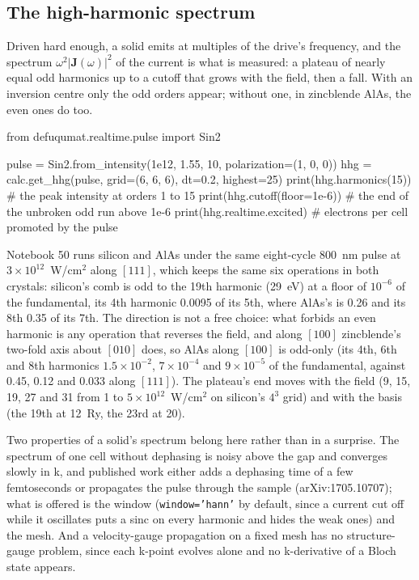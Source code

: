 \documentclass[11pt,a4paper]{article}
\newcommand{\code}[1]{\texttt{\small #1}}
\begin{document}
\subsection{The high-harmonic spectrum}

Driven hard enough, a solid emits at multiples of the drive's frequency, and the
spectrum $\omega^2|\mathbf J(\omega)|^2$ of the current is what is measured:
a plateau of nearly equal odd harmonics up to a cutoff that grows with the field,
then a fall. With an inversion centre only the odd orders appear; without one,
in zincblende AlAs, the even ones do too.

\begin{pycode}
from defuqumat.realtime.pulse import Sin2

pulse = Sin2.from_intensity(1e12, 1.55, 10, polarization=(1, 0, 0))
hhg = calc.get_hhg(pulse, grid=(6, 6, 6), dt=0.2, highest=25)
print(hhg.harmonics(15))          # the peak intensity at orders 1 to 15
print(hhg.cutoff(floor=1e-6))     # the end of the unbroken odd run above 1e-6
print(hhg.realtime.excited)       # electrons per cell promoted by the pulse
\end{pycode}

Notebook 50 runs silicon and AlAs under the same eight-cycle 800~nm pulse at
$3\times10^{12}$~W/cm$^2$ along $[111]$, which keeps the same six operations in both
crystals: silicon's comb is odd to the 19th harmonic (29~eV) at a floor of
$10^{-6}$ of the fundamental, its 4th harmonic 0.0095 of its 5th, where AlAs's is
0.26 and its 8th 0.35 of its 7th. The direction is not a free choice: what forbids
an even harmonic is any operation that reverses the field, and along $[100]$
zincblende's two-fold axis about $[010]$ does, so AlAs along $[100]$ is odd-only
(its 4th, 6th and 8th harmonics $1.5\times10^{-2}$, $7\times10^{-4}$ and
$9\times10^{-5}$ of the fundamental, against 0.45, 0.12 and 0.033 along $[111]$).
The plateau's end moves with the field (9, 15, 19, 27 and 31 from 1 to
$5\times10^{12}$~W/cm$^2$ on silicon's $4^3$ grid) and with the basis (the 19th at
12~Ry, the 23rd at 20).

Two properties of a solid's spectrum belong here rather than in a surprise. The
spectrum of one cell without dephasing is noisy above the gap and converges
slowly in k, and published work either adds a dephasing time of a few
femtoseconds or propagates the pulse through the sample (arXiv:1705.10707); what
is offered is the window (\code{window='hann'} by default, since a current cut
off while it oscillates puts a sinc on every harmonic and hides the weak ones)
and the mesh. And a velocity-gauge propagation on a fixed mesh has no
structure-gauge problem, since each k-point evolves alone and no k-derivative of
a Bloch state appears.
\end{document}
